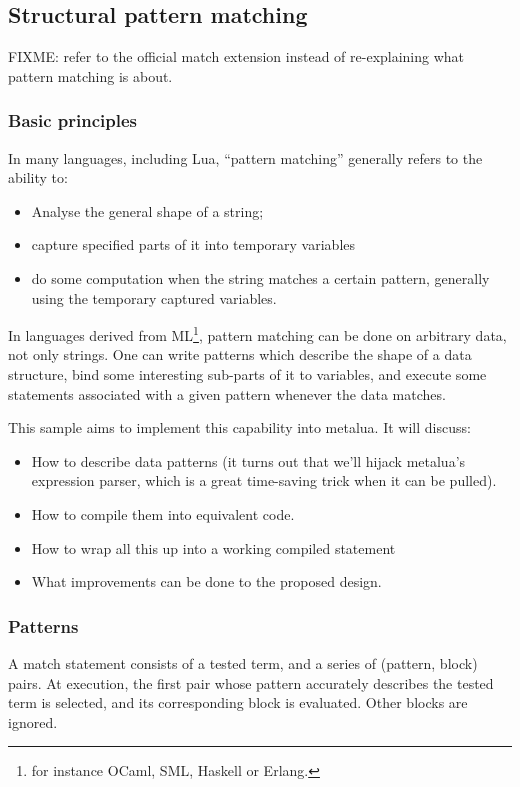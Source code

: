 \subsection{Structural pattern matching}

FIXME: refer to the official match extension instead of re-explaining
what pattern matching is about.

\subsubsection{Basic principles}
In many languages, including Lua, ``pattern matching'' generally
refers to the ability to:
\begin{itemize}
\item Analyse the general shape of a string;
\item capture specified parts of it into temporary variables
\item do some computation when the string matches a certain pattern,
  generally using the temporary captured variables.
\end{itemize}

In languages derived from ML\footnote{for instance OCaml, SML, Haskell
  or Erlang.}, pattern matching can be done on arbitrary data, not
only strings. One can write patterns which describe the shape of a
data structure, bind some interesting sub-parts of it to variables,
and execute some statements associated with a given pattern whenever
the data matches.

This sample aims to implement this capability into metalua. It will
discuss:
\begin{itemize}
\item How to describe data patterns (it turns out that we'll hijack
  metalua's expression parser, which is a great time-saving trick when
  it can be pulled).
\item How to compile them into equivalent code.
\item How to wrap all this up into a working compiled statement
\item What improvements can be done to the proposed design.
\end{itemize}

\subsubsection{Patterns}
A match statement consists of a tested term, and a series of (pattern,
block) pairs. At execution, the first pair whose pattern accurately
describes the tested term is selected, and its corresponding block is
evaluated. Other blocks are ignored. 


